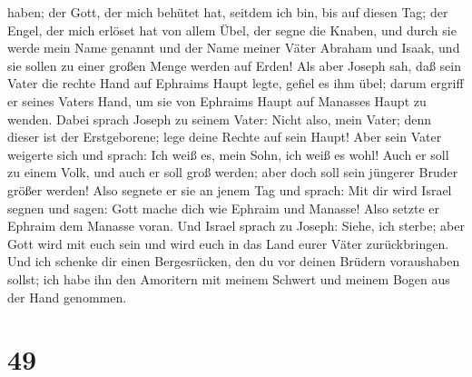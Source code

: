 haben; der Gott, der mich behütet hat, seitdem ich bin, bis auf diesen
Tag;  der Engel, der mich erlöset hat von allem Übel, der
segne die Knaben, und durch sie werde mein Name genannt und der Name
meiner Väter Abraham und Isaak, und sie sollen zu einer großen Menge
werden auf Erden!  Als aber Joseph sah, daß sein Vater
die rechte Hand auf Ephraims Haupt legte, gefiel es ihm übel; darum
ergriff er seines Vaters Hand, um sie von Ephraims Haupt auf Manasses
Haupt zu wenden.  Dabei sprach Joseph zu seinem Vater:
Nicht also, mein Vater; denn dieser ist der Erstgeborene; lege deine
Rechte auf sein Haupt!  Aber sein Vater weigerte sich und
sprach: Ich weiß es, mein Sohn, ich weiß es wohl! Auch er soll zu einem
Volk, und auch er soll groß werden; aber doch soll sein jüngerer Bruder
größer werden!  Also segnete er sie an jenem Tag und
sprach: Mit dir wird Israel segnen und sagen: Gott mache dich wie
Ephraim und Manasse! Also setzte er Ephraim dem Manasse voran.
 Und Israel sprach zu Joseph: Siehe, ich sterbe; aber
Gott wird mit euch sein und wird euch in das Land eurer Väter
zurückbringen.  Und ich schenke dir einen Bergesrücken,
den du vor deinen Brüdern voraushaben sollst; ich habe ihn den Amoritern
mit meinem Schwert und meinem Bogen aus der Hand genommen.

\hypertarget{section-48}{%
\section{49}\label{section-48}}

